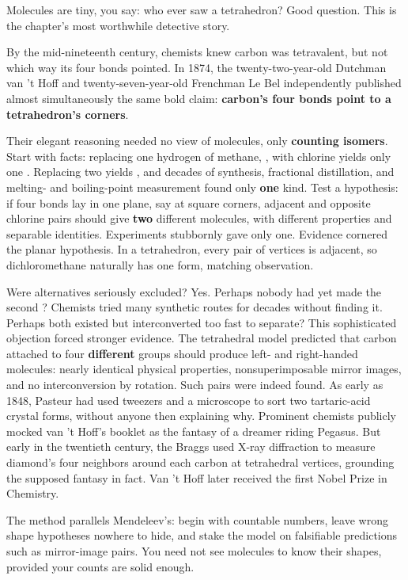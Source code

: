 Molecules are tiny, you say: who ever saw a tetrahedron? Good question. This is the chapter's most worthwhile detective story.

\begin{zhengju}
By the mid-nineteenth century, chemists knew carbon was tetravalent, but not which way its four bonds pointed. In 1874, the twenty-two-year-old Dutchman van 't Hoff and twenty-seven-year-old Frenchman Le Bel independently published almost simultaneously the same bold claim: \textbf{carbon's four bonds point to a tetrahedron's corners}.

Their elegant reasoning needed no view of molecules, only \textbf{counting isomers}. Start with facts: replacing one hydrogen of methane, , with chlorine yields only one . Replacing two yields , and decades of synthesis, fractional distillation, and melting- and boiling-point measurement found only \textbf{one} kind. Test a hypothesis: if four bonds lay in one plane, say at square corners, adjacent and opposite chlorine pairs should give \textbf{two} different  molecules, with different properties and separable identities. Experiments stubbornly gave only one. Evidence cornered the planar hypothesis. In a tetrahedron, every pair of vertices is adjacent, so dichloromethane naturally has one form, matching observation.

Were alternatives seriously excluded? Yes. Perhaps nobody had yet made the second ? Chemists tried many synthetic routes for decades without finding it. Perhaps both existed but interconverted too fast to separate? This sophisticated objection forced stronger evidence. The tetrahedral model predicted that carbon attached to four \textbf{different} groups should produce left- and right-handed molecules: nearly identical physical properties, nonsuperimposable mirror images, and no interconversion by rotation. Such pairs were indeed found. As early as 1848, Pasteur had used tweezers and a microscope to sort two tartaric-acid crystal forms, without anyone then explaining why. Prominent chemists publicly mocked van 't Hoff's booklet as the fantasy of a dreamer riding Pegasus. But early in the twentieth century, the Braggs used X-ray diffraction to measure diamond's four neighbors around each carbon at tetrahedral vertices, grounding the supposed fantasy in fact. Van 't Hoff later received the first Nobel Prize in Chemistry.

The method parallels Mendeleev's: begin with countable numbers, leave wrong shape hypotheses nowhere to hide, and stake the model on falsifiable predictions such as mirror-image pairs. You need not see molecules to know their shapes, provided your counts are solid enough.
\end{zhengju}

